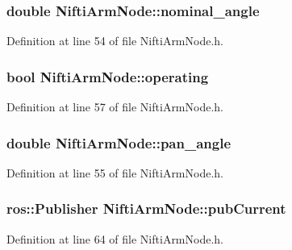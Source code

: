 \subsubsection[{nominal\-\_\-angle}]{\setlength{\rightskip}{0pt plus 5cm}double {\bf \-Nifti\-Arm\-Node\-::nominal\-\_\-angle}\hspace{0.3cm}{\ttfamily  [private]}}\label{classNiftiArmNode_ae4948957af57f37d8f7312ec3c501cde}


\-Definition at line 54 of file \-Nifti\-Arm\-Node.\-h.

\subsubsection[{operating}]{\setlength{\rightskip}{0pt plus 5cm}bool {\bf \-Nifti\-Arm\-Node\-::operating}\hspace{0.3cm}{\ttfamily  [private]}}\label{classNiftiArmNode_aa551d6b85d0ea9e040c2ff008b97b152}


\-Definition at line 57 of file \-Nifti\-Arm\-Node.\-h.

\subsubsection[{pan\-\_\-angle}]{\setlength{\rightskip}{0pt plus 5cm}double {\bf \-Nifti\-Arm\-Node\-::pan\-\_\-angle}\hspace{0.3cm}{\ttfamily  [private]}}\label{classNiftiArmNode_a3e4a0dab413a1c12f10c13d9d1a01145}


\-Definition at line 55 of file \-Nifti\-Arm\-Node.\-h.

\subsubsection[{pub\-Current}]{\setlength{\rightskip}{0pt plus 5cm}ros\-::\-Publisher {\bf \-Nifti\-Arm\-Node\-::pub\-Current}\hspace{0.3cm}{\ttfamily  [private]}}\label{classNiftiArmNode_a0d83b122e25357d7c65ca95969a5d739}


\-Definition at line 64 of file \-Nifti\-Arm\-Node.\-h.


